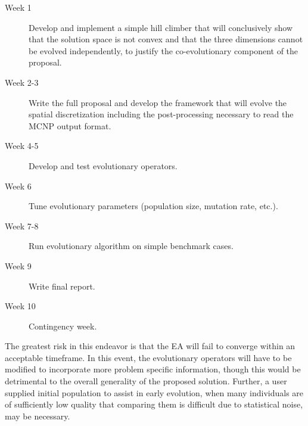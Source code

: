 \documentclass{article}
\begin{document}
\begin{description}
\item[Week 1] Develop and implement a simple hill climber that will conclusively show that the solution space is not convex and that the three dimensions cannot be evolved independently, to justify the co-evolutionary component of the proposal.

\item[Week 2-3] Write the full proposal and develop the framework that will evolve the spatial discretization including the post-processing necessary to read the MCNP output format.

\item [Week 4-5] Develop and test evolutionary operators.

\item [Week 6] Tune evolutionary parameters (population size, mutation rate, etc.).

\item [Week 7-8] Run evolutionary algorithm on simple benchmark cases.

\item [Week 9] Write final report.

\item [Week 10] Contingency week.
\end{description}

The greatest risk in this endeavor is that the EA will fail to converge within an acceptable timeframe. In this event, the evolutionary operators will have to be modified to incorporate more problem specific information, though this would be detrimental to the overall generality of the proposed solution. Further, a user supplied initial population to assist in early evolution, when many individuals are of sufficiently low quality that comparing them is difficult due to statistical noise, may be necessary.
\end{document}
